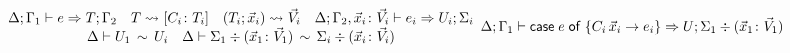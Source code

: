 \begin{figure}[t]
\begin{gather*}
{\begin{array}{c}
    \algtypeout[\Delta;\Gamma_1]{e}{T}{\Gamma_2}
    \quad
    T \extract{}[C_i\colon T_i]
    \quad
    (T_i;\vec x_i) \extract{}{\vec V_i}
    \quad
    \algtypeout[\Delta;\Gamma_2, \vec x_i\colon\vec V_i]{e_i}{U_i}{\Sigma_i}
    \\
    \typeequiv{U_1}{U_i}    
    \quad
    \ctxequiv{\Sigma_1 \div (\vec x_1\colon\vec V_1)}{\Sigma_i \div (\vec x_i\colon\vec V_i)} 
    \end{array}
  }{
    \algtypeout[\Delta;\Gamma_1]{\casee{e}{\{C_i\,\vec x_i\rightarrow e_i\}}}{U}{\Sigma_1 \div (\vec x_1\colon\vec V_1)}
  }
  \end{gather*}
\end{figure}

